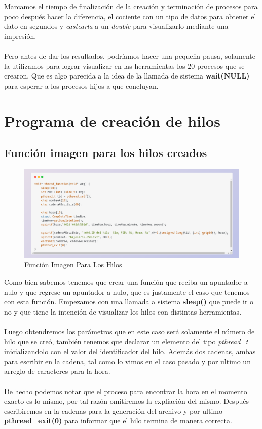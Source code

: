 \documentclass[10pt]{article}
\begin{document}
	\\\\
	Marcamos el tiempo de finalización de la creación y terminación de procesos para poco después hacer la diferencia, el cociente con un tipo de datos para obtener el dato en segundos y \emph{castearla} a un \textit{double} para visualizarlo mediante una impresión. 
	\\\\
	Pero antes de dar los resultados, podríamos hacer una pequeña pausa,  solamente la utilizamos para lograr visualizar en las herramientas los 20 procesos que se crearon. Que es algo parecida a la idea de la llamada de sistema \textbf{wait(NULL)} para esperar a los procesos hijos a que concluyan. 
	\section{Programa de creación de hilos}
	\subsection{Función imagen para los hilos creados}
	\begin{figure}[h!]
		\centering
		\includegraphics[width=\linewidth]{funH.png}
		\caption{Función Imagen Para Los Hilos}
		\label{fig:funH}
	\end{figure}
	Como bien sabemos tenemos que crear una función que reciba un apuntador a nulo y que regrese un apuntador a nulo, que es justamente el caso que tenemos con esta función. Empezamos con una llamada a sistema \textbf{sleep()} que puede ir o no y que tiene la intención de visualizar los hilos con distintas herramientas. 
	\\\\
	Luego obtendremos los parámetros que en este caso será solamente el número de hilo que se creó, también tenemos que declarar un elemento del tipo \textit{pthread\_t} inicializandolo con el valor del identificador del hilo. Además dos cadenas, ambas para escribir en la cadena, tal como lo vimos en el caso pasado y por ultimo un arreglo de caracteres para la hora.
	\\\\
	De hecho podemos notar que el proceso para encontrar la hora en el momento exacto es lo mismo, por tal razón omitiremos la expliación del mismo. Después escribiremos en la cadenas para la generación del archivo y por ultimo \textbf{pthread\_exit(0)} para informar que el hilo termina de manera correcta. 
\end{document}
